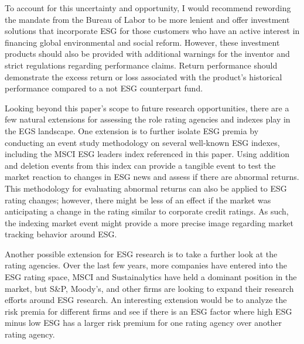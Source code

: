 To account for this uncertainty and opportunity,  I would recommend rewording the mandate from the Bureau of Labor to be more lenient and offer investment solutions that incorporate ESG for those customers who have an active interest in financing global environmental and social reform. However,  these investment products should also be provided with additional warnings for the inventor and strict regulations regarding performance claims. Return performance should demonstrate the excess return or loss associated with the product's historical performance compared to a not ESG counterpart fund. 

Looking beyond this paper's scope to future research opportunities, there are a few natural extensions for assessing the role rating agencies and indexes play in the EGS landscape. One extension is to further isolate ESG premia by conducting an event study methodology on several well-known ESG indexes, including the MSCI ESG leaders index referenced in this paper. Using addition and deletion events from this index can provide a tangible event to test the market reaction to changes in ESG news and assess if there are abnormal returns. This methodology for evaluating abnormal returns can also be applied to ESG rating changes; however, there might be less of an effect if the market was anticipating a change in the rating similar to corporate credit ratings. As such, the indexing market event might provide a more precise image regarding market tracking behavior around ESG.

Another possible extension for ESG research is to take a further look at the rating agencies. Over the last few years, more companies have entered into the ESG rating space, MSCI and Sustainalytics have held a dominant position in the market, but S\&P, Moody's, and other firms are looking to expand their research efforts around ESG research. An interesting extension would be to analyze the risk premia for different firms and see if there is an ESG factor where high ESG minus low ESG has a larger risk premium for one rating agency over another rating agency.